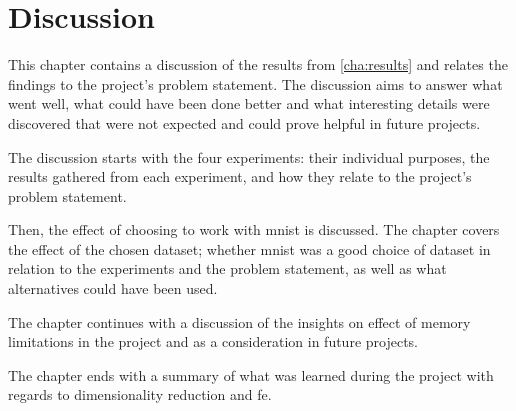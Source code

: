 \chapter{Discussion}\label{cha:discussion}
This chapter contains a discussion of the results from \autoref{cha:results} and relates the findings to the project's problem statement. The discussion aims to answer what went well, what could have been done better and what interesting details were discovered that were not expected and could prove helpful in future projects.

The discussion starts with the four experiments: their individual purposes, the results gathered from each experiment, and how they relate to the project's problem statement.

Then, the effect of choosing to work with \gls{mnist} is discussed. The chapter covers the effect of the chosen dataset; whether \gls{mnist} was a good choice of dataset in relation to the experiments and the problem statement, as well as what alternatives could have been used.

The chapter continues with a discussion of the insights on effect of memory limitations in the project and as a consideration in future projects.

The chapter ends with a summary of what was learned during the project with regards to dimensionality reduction and \gls{fe}.




% 

